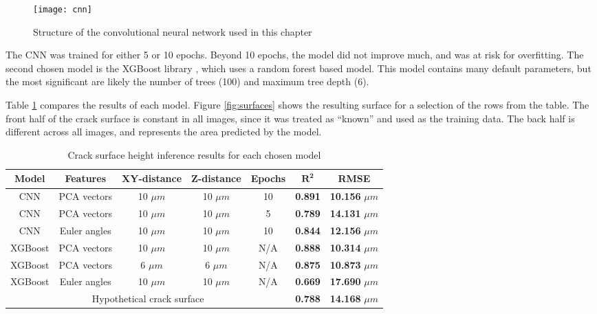 \begin{figure}[b]
  \centering
    \texttt{[image: cnn]}
    \caption{Structure of the convolutional neural network used in this chapter}
  \label{fig:cnn}
\end{figure}

The CNN was trained for either 5 or 10 epochs.  Beyond 10 epochs, the model did not improve much, and was at risk for overfitting.  The second chosen model is the XGBoost library \cite{xgboost}, which uses a random forest based model.  This model contains many default parameters, but the most significant are likely the number of trees (100) and maximum tree depth (6).

Table \ref{table:model-comparison} compares the results of each model.  Figure \ref{fig:surfaces} shows the resulting surface for a selection of the rows from the table.  The front half of the crack surface is constant in all images, since it was treated as ``known'' and used as the training data.  The back half is different across all images, and represents the area predicted by the model.

\begin{table}[t]
  \centering
  \caption{Crack surface height inference results for each chosen model}
  \label{table:model-comparison}
  \begin{tabular}{| c | c | c | c | c | c | c |} \hline
    \textbf{Model} & \textbf{Features} & \textbf{XY-distance} & \textbf{Z-distance} & \textbf{Epochs} & $\bm{R^2}$     & \textbf{RMSE}           \\ \hline
    CNN            & PCA vectors       & 10 $\mu m$           & 10 $\mu m$          & 10              & \textbf{0.891} & \textbf{10.156} $\mu m$ \\ \hline
    CNN            & PCA vectors       & 10 $\mu m$           & 10 $\mu m$          & 5               & \textbf{0.789} & \textbf{14.131} $\mu m$ \\ \hline
    CNN            & Euler angles      & 10 $\mu m$           & 10 $\mu m$          & 10              & \textbf{0.844} & \textbf{12.156} $\mu m$ \\ \hline
    XGBoost        & PCA vectors       & 10 $\mu m$           & 10 $\mu m$          & N/A             & \textbf{0.888} & \textbf{10.314} $\mu m$ \\ \hline
    XGBoost        & PCA vectors       & 6  $\mu m$           & 6  $\mu m$          & N/A             & \textbf{0.875} & \textbf{10.873} $\mu m$ \\ \hline
    XGBoost        & Euler angles      & 10 $\mu m$           & 10 $\mu m$          & N/A             & \textbf{0.669} & \textbf{17.690} $\mu m$ \\ \hline
    \multicolumn{5}{|c|}{Hypothetical crack surface}                                                  & \textbf{0.788} & \textbf{14.168} $\mu m$ \\ \hline
  \end{tabular}
\end{table}

